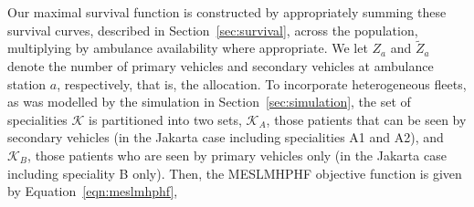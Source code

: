 \documentclass[preprint,12pt]{elsarticle}
\begin{document}




Our maximal survival function is constructed by appropriately summing these survival curves, described in Section~\ref{sec:survival}, across the population, multiplying by ambulance availability where appropriate.
We let $Z_a$ and $\tilde{Z}_a$ denote the number of primary vehicles and secondary vehicles at ambulance station $a$, respectively, that is, the allocation. To incorporate heterogeneous fleets, as was modelled by the simulation in Section~\ref{sec:simulation}, the set of specialities $\mathcal{K}$ is partitioned into two sets, $\mathcal{K}_A$, those patients that can be seen by secondary vehicles (in the Jakarta case including specialities A1 and A2), and $\mathcal{K}_B$, those patients who are seen by primary vehicles only (in the Jakarta case including speciality B only). Then, the MESLMHPHF objective function is given by Equation~\ref{eqn:meslmhphf},
\end{document}
